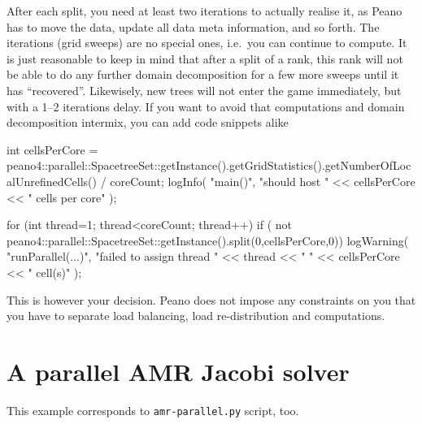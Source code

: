 After each split, you need at least two iterations to actually realise it, as 
Peano has to move the data, update all data meta information, and so forth. 
The iterations (grid sweeps) are no special ones, i.e.~you can continue to
compute.
It is just reasonable to keep in mind that after a split of a rank, this rank
will not be able to do any further domain decomposition for a few more sweeps
until it has ``recovered''. 
Likewisely, new trees will not enter the game immediately, but with a 1--2
iterations delay.
If you want to avoid that computations and domain decomposition intermix, you
can add code snippets alike

\begin{code}
int cellsPerCore = peano4::parallel::SpacetreeSet::getInstance().getGridStatistics().getNumberOfLocalUnrefinedCells() / coreCount;
logInfo( "main()", "should host " << cellsPerCore << " cells per core" );

for (int thread=1; thread<coreCount; thread++) {
  if ( not peano4::parallel::SpacetreeSet::getInstance().split(0,cellsPerCore,0)) { 
   logWarning( "runParallel(...)", "failed to assign thread " << thread << " " << cellsPerCore << " cell(s)" ); 
  }
}
\end{code}

\noindent
This is however your decision. Peano does not impose any constraints on you that
you have to separate load balancing, load re-distribution and computations.


\section{A parallel AMR Jacobi solver}

\begin{remark}
 This example corresponds to \texttt{amr-parallel.py} script, too.
\end{remark}
